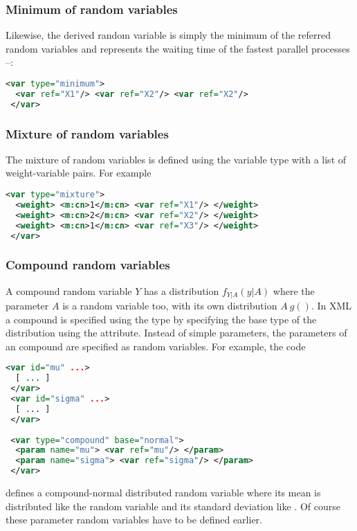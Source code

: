 \subsubsection{Minimum of random variables}
Likewise, the  derived random variable is simply the minimum of the referred random
variables and represents the waiting time of the fastest parallel processes --:
\begin{lstlisting}[language=XML]
 <var type="minimum">
  <var ref="X1"/> <var ref="X2"/> <var ref="X2"/>
 </var>
\end{lstlisting}

\subsubsection{Mixture of random variables}
The mixture of random variables is defined using the  variable type with a list of
weight-variable pairs. For example
\begin{lstlisting}[language=XML]
 <var type="mixture">
  <weight> <m:cn>1</m:cn> <var ref="X1"/> </weight>
  <weight> <m:cn>2</m:cn> <var ref="X2"/> </weight>
  <weight> <m:cn>1</m:cn> <var ref="X3"/> </weight>
 </var>
\end{lstlisting}

\subsubsection{Compound random variables} 
A compound random variable $Y$ has a distribution $f_{Y|A}(y|A)$ where the parameter $A$ is a random
variable too, with its own distribution $A~g()$. In XML a compound is specified using the 
 type by specifying the base type of the distribution using the  attribute.
Instead of simple parameters, the parameters of an compound are specified as random variables. 
For example, the code
\begin{lstlisting}[language=XML]
 <var id="mu" ...>
  [ ... ]
 </var>
 <var id="sigma" ...>
  [ ... ]
 </var>
 
 <var type="compound" base="normal">
  <param name="mu"> <var ref="mu"/> </param>
  <param name="sigma"> <var ref="sigma"/> </param>
 </var>
\end{lstlisting}
defines a compound-normal distributed random variable where its mean is distributed like the random 
variable  and its standard deviation like . Of course these parameter random 
variables have to be defined earlier.


